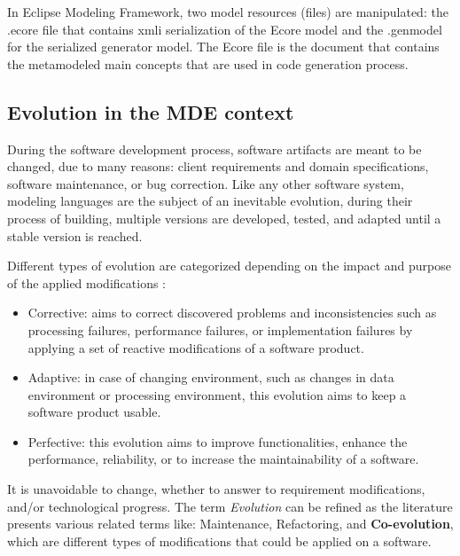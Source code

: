 In Eclipse Modeling Framework, two model resources (files) are manipulated: the .ecore file that contains  xmli serialization of the Ecore model and the .genmodel for the serialized generator model. The Ecore file is the document that contains the metamodeled main concepts that are used in code generation process.

\subsection{Evolution in the MDE context}

During the software development process, software artifacts are meant to be changed, due to many reasons: client requirements and domain specifications, software maintenance, or bug correction. Like any other software system, modeling languages are the subject of an inevitable evolution, during their process of building, multiple versions are developed, tested, and adapted until a stable version is reached. 

Different types of evolution are categorized depending on the impact and purpose of the applied modifications \cite{lientz1980software,Swanson1976}:
\begin{itemize}
	
	\item  Corrective: aims to correct discovered problems and inconsistencies such as processing failures, performance failures, or implementation failures by applying  a set of reactive modifications of a software product.  
	
	\item  Adaptive: in case of changing environment, such as changes in data environment or processing environment, this evolution aims to keep a software product usable.
	
	\item Perfective: this evolution aims to improve functionalities, enhance the performance, reliability, or to increase the maintainability of a software.  
	
\end{itemize}
It is unavoidable to change, whether to answer to requirement modifications, and/or technological progress.
The term \textit{Evolution} can be refined as the literature presents various related terms like: Maintenance, Refactoring, and \textbf{Co-evolution}, which are different types of modifications that could be applied on a software.



